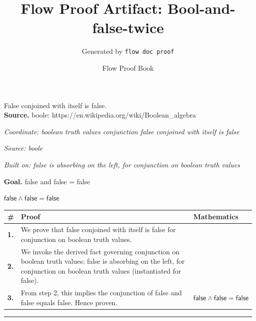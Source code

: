 \documentclass[11pt]{article}
\title{Flow Proof Artifact: Bool-and-false-twice}
\author{Generated by \texttt{flow doc proof}}
\date{Flow Proof Book}
\theoremstyle{definition}
\begin{document}
\maketitle
False conjoined with itself is false.\\[0.5em]
\textbf{Source.} boole: https://en.wikipedia.org/wiki/Boolean\_algebra\\[0.5em]
\bigskip
{}\par
\smallskip\noindent\textit{Coordinate: boolean truth values \cdot conjunction \cdot false conjoined with itself is false}\par
\smallskip\noindent\textit{Source: boole}\par
\smallskip\noindent\textit{Built on: false is absorbing on the left, for conjunction on boolean truth values}\par
\medskip
\noindent\textbf{Goal.} false and false = false\par
\noindent$\displaystyle \mathsf{false} \land \mathsf{false} = \mathsf{false}$\par
\medskip
\noindent
\begin{tabular}{@{} >{\raggedright\arraybackslash}p{} >{\raggedright\arraybackslash}p{} >{\raggedleft\arraybackslash}p{} @{}}
\textbf{\#} & \textbf{Proof} & \textbf{Mathematics} \\
\midrule
\textbf{1.} & We prove that false conjoined with itself is false for conjunction on boolean truth values. & \\[0.45em]
\textbf{2.} & We invoke the derived fact governing conjunction on boolean truth values: false is absorbing on the left, for conjunction on boolean truth values (instantiated for false). & \\[0.45em]
\textbf{3.} & From step 2, this implies the conjunction of false and false equals false. Hence proven. & $\displaystyle \mathsf{false} \land \mathsf{false} = \mathsf{false}$ \\[0.45em]
\bottomrule
\end{tabular}
\label{thm:Bool-conjunction-false_conjoined_with_itself_is_false}
\par\medskip\hrule
\end{document}

